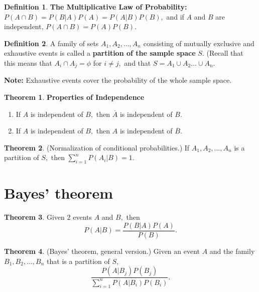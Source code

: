 \documentclass[12pt, a4paper]{article}
\theoremstyle{definition}
\newtheorem{definition}{Definition}[section]
\newtheorem{theorem}{Theorem}[section]
\theoremstyle{plain}
\begin{document}
\begin{definition}
\textbf{The Multiplicative Law of Probability:} \\
$P (A\cap B) = P (B|A)P(A) = P(A|B)P(B),$ and if $A$ and $B$ are independent, $P(A \cap B) = P (A)P(B).$
\end{definition}

\begin{definition}
A family of sets $A_1,A_2 ,\ldots,A_n$ consisting of mutually exclusive and exhaustive events is called a \textbf{partition of the sample space} $S.$ (Recall that this means that $A_i \cap A_j = \phi$ for $i \neq j,$ and that $S = A_1 \cup A_2\ldots \cup A_n.$
\end{definition}

\textbf{Note:} Exhaustive events cover the probability of the whole sample space.

\begin{theorem}
\textbf{Properties of Independence}
\begin{enumerate}
	
	\item If $A$ is independent of $B,$ then $\overline{A}$ is independent of $B.$

	\item If $A$ is independent of $B,$ then $A$ is independent of $\overline{B}.$

\end{enumerate}
\end{theorem}

\begin{theorem}
(Normalization of conditional probabilities.) If $A_1, A_2,\ldots,A_n$ is a partition of $S,$ then $\sum_{i=1}^{n} P(A_i|B) = 1.$
\end{theorem}

\section{Bayes' theorem}

\begin{theorem}
Given $2$ events $A$ and $B,$ then $$P(A|B)=\frac{P(B|A)P(A)}{P(B)}.$$
\end{theorem}

\begin{theorem}
(Bayes' theorem, general version.) Given an event $A$ and the family $B_1, B_2,\ldots, B_n$ that is a partition of $S,$ $$\frac{P(A|B_j)P(B_j)}{\sum_{i=1}^{n} P(A|B_i)P(B_i)}.$$
\end{theorem}
\end{document}
